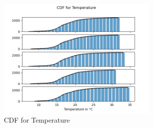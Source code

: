 \documentclass[a4paper,12pt]{article}
\begin{document}
  \begin{figure}[H] 
	\centering
	\includegraphics[width=0.7\textwidth]{CDF for Temperature.png}
	\caption{CDF for Temperature\cite{Maiullari2020}}
  \end{figure}
\pagebreak
\end{document}

